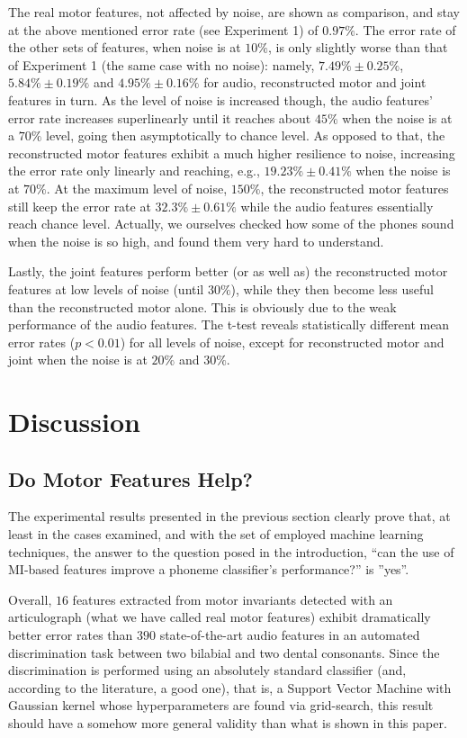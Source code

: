 \documentclass[10pt]{article}
\begin{document}
The real motor features, not affected by noise, are shown as comparison, and stay at
the above mentioned error rate (see Experiment 1) of $0.97\%$. The error rate of the
other sets of features, when noise is at $10\%$, is only slightly worse than that of
Experiment 1 (the same case with no noise): namely,
$7.49\% \pm 0.25\%$, 
$5.84\% \pm 0.19\%$ and 
$4.95\% \pm 0.16\%$ for audio, reconstructed motor and joint features in turn.
As the level of noise is increased though, the audio features' error rate
increases superlinearly until it reaches about $45\%$ when the noise is at a $70\%$
level, going then asymptotically to chance level. As opposed to that, the reconstructed
motor features exhibit a much higher resilience to noise, increasing the error rate
only linearly and reaching, e.g., $19.23\% \pm 0.41\%$ when the noise is at $70\%$.
At the maximum level of noise, $150\%$, the reconstructed motor features still keep
the error rate at $32.3\% \pm 0.61\%$ while the audio features essentially reach chance
level. Actually, we ourselves checked how some of the phones sound when the noise is
so high, and found them very hard to understand.

Lastly, the joint features perform better (or as well as) the reconstructed motor features
at low levels of noise (until $30\%$), while they then become less useful than the
reconstructed motor alone. This is obviously due to the weak performance of the audio
features.
The t-test reveals statistically different mean error rates ($p<0.01$) for all levels of
noise, except for reconstructed motor and joint when the noise is at $20\%$
and $30\%$.

\section*{Discussion}
\label{sec:disc}

\subsection*{Do Motor Features Help?}

The experimental results presented in the previous section clearly prove that,
at least in the cases examined, and with the set of employed machine learning techniques,
the answer to the question posed in the introduction, ``can the use of MI-based
features improve a phoneme classifier's performance?'' is ''yes''.

Overall, $16$ features extracted from motor invariants detected with an articulograph
(what we have called real motor features) exhibit dramatically better error rates
than $390$ state-of-the-art audio features in an automated discrimination task between
two bilabial and two dental consonants. Since the discrimination is performed using an
absolutely standard classifier (and, according to the literature, a good one), that is,
a Support Vector Machine with Gaussian kernel whose hyperparameters are found via
grid-search, this result should have a somehow more general validity than what is shown
in this paper.
\end{document}
